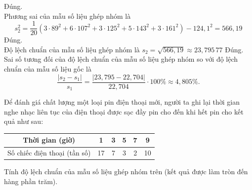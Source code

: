 \begin{ex}
{\begin{itemchoice}
			\itemch Đúng.\\
			Phương sai của mẫu số liệu ghép nhóm là
			$$
			s_2^2=\dfrac{1}{20}\left(3\cdot 89^2+6\cdot 107^2+3\cdot 125^2+5\cdot 143^2+3\cdot 161^2\right)-124{,}1^2=566{,}19
			$$
			\itemch Đúng.\\
			Độ lệch chuẩn của mẫu số liệu ghép nhóm là $s_2=\sqrt{566{,}19}\approx 23{,}795\,77$
			\itemch Đúng.\\
			Sai số tương đối của độ lệch chuẩn của mẫu số liệu ghép nhóm so với độ lệch chuẩn của mẫu số liệu gốc là $$\dfrac{\left|s_2-s_1\right|}{s_1}=\dfrac{|23{,}795-22{,}704|}{22{,}704}\cdot 100 \% \approx 4{,}805 \%.$$
		\end{itemchoice}
	}
\end{ex}

\begin{ex}%
	Để đánh giá chất lượng một loại pin điện thoại mới, người ta ghi lại thời gian nghe nhạc liên tục của điện thoại được sạc đầy pin cho đến khi hết pin cho kết quả như sau:
	\begin{center}
		\begin{tabular}{|c|c|c|c|c|c|}
			\hline
			Thời gian (giờ) & 1 & 3 & 5 & 7 & 9\\ \hline
			Số chiếc điện thoại (tần số) & 17 & 7 & 3 & 2 & 10\\ \hline
		\end{tabular}
	\end{center}
	Tính độ lệch chuẩn của mẫu số liệu ghép nhóm trên (kết quả được làm tròn đến hàng phần trăm).
	
\end{ex}

